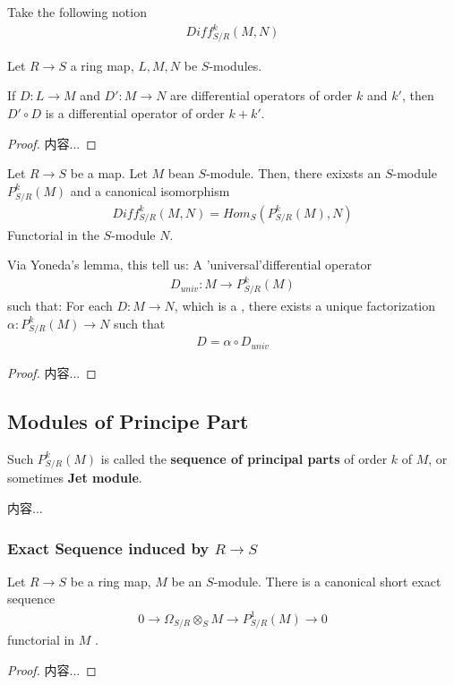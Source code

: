 \documentclass[Total.tex]{subfiles}
\begin{document}
			Take the following notion
			\begin{gather*}
				Diff_{S/R}^k(M,N)
			\end{gather*}
			\begin{proposition}
				Let $R\rightarrow S$ a ring map, $L,M,N$ be $S$-modules.
				
				If $D:L\rightarrow M$ and $D':M\rightarrow N$ are differential operators of order $k$ and $k'$, then $D'\circ D$ is a differential operator of order $k+k'$.
			\end{proposition}
			\begin{proof}
				内容...
			\end{proof}
			
			\begin{proposition}
				Let $R\rightarrow S$ be a map. Let $M$ bean $S$-module. Then, there exixsts an $S$-module $P_{S/R}^k(M)$ and a canonical isomorphism
				\begin{gather*}
					Diff^k_{S/R}(M,N)=Hom_S(P^k_{S/R}(M),N)
				\end{gather*}
				Functorial in the $S$-module $N$.
				
				Via Yoneda's lemma, this tell us: A 'universal'differential operator
				\begin{gather*}
					D_{univ}:M\rightarrow P_{S/R}^k(M)
				\end{gather*}
				such that: For each $D:M\rightarrow N$, which is a , there exists a unique factorization $\alpha:P_{S/R}^k(M)\rightarrow N$ such that
				\begin{gather*}
					D=\alpha\circ D_{univ}
				\end{gather*}
			\end{proposition}
			\begin{proof}
				内容...
			\end{proof}
			\subsection{Modules of Principe Part}
			\begin{Def}
				Such $P_{S/R}^k(M)$ is called the \textbf{sequence of principal parts} of order $k$ of $M$, or sometimes \textbf{Jet module}.
			\end{Def}
			
			\begin{example}
				内容...
			\end{example}
			\subsubsection{Exact Sequence induced by $R\rightarrow S$}
			\begin{lemma}
				Let $R\rightarrow S$ be a ring map, $M$ be an $S$-module. There is a canonical short exact sequence
				\begin{gather*}
					0\rightarrow \Omega_{S/R}\otimes_S M\rightarrow P_{S/R}^1(M)\rightarrow 0
				\end{gather*}
				functorial in $M$ .
			\end{lemma}
			\begin{proof}
				内容...
			\end{proof}
			
\end{document}
